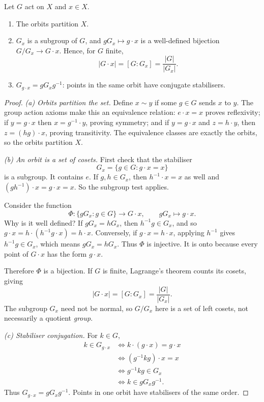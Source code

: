 \begin{theorem}\label{thm:orbstab}
Let $G$ act on $X$ and $x\in X$.
\begin{enumerate}[label=(\alph*)]
\item The orbits partition $X$.
\item $G_x$ is a subgroup of $G$, and $gG_x\mapsto g\cdot x$ is a well-defined bijection $G/G_x\to G\cdot x$. Hence, for $G$ finite,
\[
|G\cdot x|=[G:G_x]=\frac{|G|}{|G_x|}.
\]
\item $G_{g\cdot x}=gG_xg^{-1}$: points in the same orbit have conjugate stabilisers.
\end{enumerate}
\end{theorem}
\begin{proof}
\emph{(a) Orbits partition the set.}
Define $x\sim y$ if some $g\in G$ sends $x$ to $y$.
The group action axioms make this an equivalence relation:
$e\cdot x=x$ proves reflexivity;
if $y=g\cdot x$ then $x=g^{-1}\cdot y$, proving symmetry;
and if $y=g\cdot x$ and $z=h\cdot y$, then
$z=(hg)\cdot x$, proving transitivity.
The equivalence classes are exactly the orbits, so
the orbits partition $X$.

\emph{(b) An orbit is a set of cosets.}
First check that the stabiliser
\[
G_x=\{g\in G:g\cdot x=x\}
\]
is a subgroup. It contains $e$. If $g,h\in G_x$,
then $h^{-1}\cdot x=x$ as well and
$(gh^{-1})\cdot x=g\cdot x=x$.
So the subgroup test applies.

Consider the function
\[
\Phi:\{gG_x:g\in G\}\longrightarrow G\cdot x,
\qquad gG_x\longmapsto g\cdot x.
\]
Why is it well defined? If $gG_x=hG_x$, then
$h^{-1}g\in G_x$, and so
$g\cdot x=h\cdot(h^{-1}g\cdot x)=h\cdot x$.
Conversely, if $g\cdot x=h\cdot x$, applying
$h^{-1}$ gives $h^{-1}g\in G_x$, which means
$gG_x=hG_x$. Thus $\Phi$ is injective.
It is onto because every point of $G\cdot x$
has the form $g\cdot x$.

Therefore $\Phi$ is a bijection. If $G$ is finite,
Lagrange's theorem counts its cosets, giving
\[
\boxed{|G\cdot x|=[G:G_x]=\frac{|G|}{|G_x|}}.
\]
The subgroup $G_x$ need not be normal, so
$G/G_x$ here is a set of left cosets, not
necessarily a quotient \emph{group}.

\emph{(c) Stabiliser conjugation.}
For $k\in G$,
\[
\begin{aligned}
k\in G_{g\cdot x}
&\iff k\cdot(g\cdot x)=g\cdot x\\
&\iff(g^{-1}kg)\cdot x=x\\
&\iff g^{-1}kg\in G_x\\
&\iff k\in gG_xg^{-1}.
\end{aligned}
\]
Thus $G_{g\cdot x}=gG_xg^{-1}$.
Points in one orbit have stabilisers of the same order.
\end{proof}

